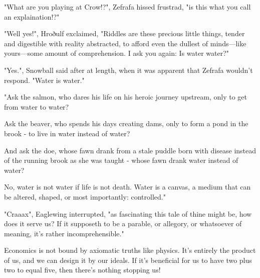 "What are you playing at Crow!?", Zefrafa hissed frustrad, "is this what you call an explaination!?"

"Well yes!", Hroðulf exclaimed, "Riddles are these precious little things, tender and digestible with reality abstracted, to afford even the dullest of minds---like yours---some amount of comprehension. I ask you again: Is water water?"

"Yes.", Snowball said after at length, when it was apparent that Zefrafa wouldn't respond. "Water is water."

"Ask the salmon, who dares his life on his heroic journey upstream, only to get from water to water?

Ask the beaver, who spends his days creating dams, only to form a pond in the brook - to live in water instead of water?

And ask the doe, whose fawn drank from a stale puddle born with disease instead of the running brook as she was taught - whose fawn drank water instead of water?

No, water is not water if life is not death. Water is a canvas, a medium that can be altered, shaped, or most importantly: controlled."

"Craaax", Eaglewing interrupted, "as fascinating this tale of thine might be, how does it serve us? If it supposeth to be a parable, or allegory, or whatsoever of meaning, it's rather incomprehensible."



Economics is not bound by axiomatic truths like physics. It's entirely the product of us, and we can design it by our ideals. If it's beneficial for us to have two plus two to equal five, then there's nothing stopping us!



